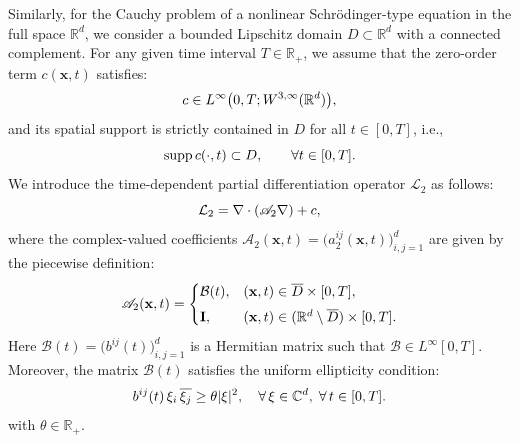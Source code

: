 \documentclass[11pt,reqno,oneside]{amsart}
\numberwithin{equation}{section}
\theoremstyle{definition}
\theoremstyle{remark}
\numberwithin{equation}{section}
\begin{document}
	


Similarly, for the Cauchy problem of a nonlinear Schr\"{o}dinger-type equation in the full space $\mathbb{R}^d$, we consider a bounded Lipschitz domain $D \subset \mathbb{R}^d$ with a connected complement. For any given time interval $T \in \mathbb{R}_+$, we assume that the zero-order term $c(\mathbf{x},t)$ satisfies:
\begin{equation}\notag
    c \in L^{\infty}\bigl(0,T; W^{3,\infty}(\mathbb{R}^d)\bigr),
\end{equation}
and its spatial support is strictly contained in $D$ for all $t \in [0,T]$, i.e.,
\begin{equation}\notag
    \operatorname{supp} c(\cdot,t) \subset D, \qquad \forall t \in [0,T].
\end{equation}
We introduce the time-dependent partial differentiation operator $\mathcal{L}_2$ as follows:
\begin{equation}\notag
    \mathcal{L}_2 = 
\nabla \cdot (\mathscr{A}_2 
\nabla ) + c,
\end{equation}
where the complex-valued coefficients $\mathscr{A}_2(\mathbf{x},t) = \big(a_2^{ij}(\mathbf{x},t)\big)_{i,j=1}^d$ are given by the piecewise definition:
\begin{equation}\notag
    \mathscr{A}_2(\mathbf{x},t) =
    \begin{cases}
        \mathcal{B}(t), & (\mathbf{x},t) \in \overline{D} 	\times [0,T], \\[4pt]
        \mathbf{I}, & (\mathbf{x},t) \in (\mathbb{R}^d \setminus \overline{D}) 	\times [0,T].
    \end{cases}
\end{equation}
Here  $\mathcal{B}(t) = \big(b^{ij}(t)\big)_{i,j=1}^d$ is a Hermitian matrix such that $\mathcal{B} \in L^{\infty}[0,T]$. Moreover, the matrix $\mathcal{B}(t)$ satisfies the uniform ellipticity condition:
\begin{equation}\notag
    b^{ij}(t)\,\xi_i\,\overline{\xi_j} \ge 	\theta |\xi|^2, \quad \forall\, \xi \in \mathbb{C}^d, \; \forall\, t \in [0,T].
\end{equation}
with $\theta \in \mathbb R_+$. 
\end{document}
